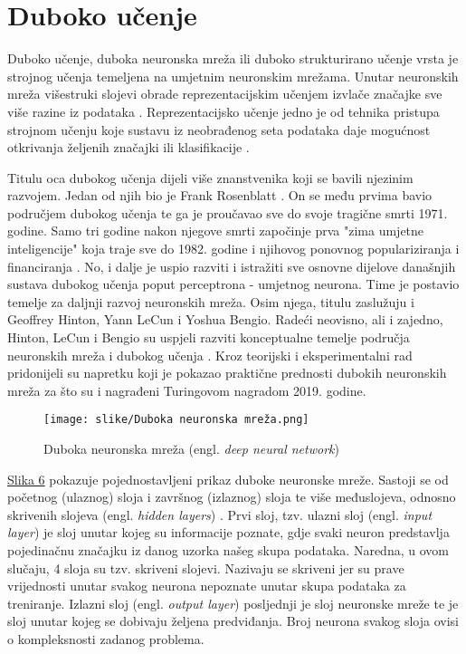\documentclass[]{foi} %
\begin{document}
\section{Duboko učenje}
Duboko učenje, duboka neuronska mreža ili duboko strukturirano učenje vrsta je strojnog učenja temeljena na umjetnim neuronskim mrežama. Unutar neuronskih mreža višestruki slojevi obrade reprezentacijskim učenjem izvlače značajke sve više razine iz podataka \cite{dubokoRepr}. Reprezentacijsko učenje jedno je od tehnika pristupa strojnom učenju koje sustavu iz neobrađenog seta podataka daje mogućnost otkrivanja željenih značajki ili klasifikacije \cite{reprezentacijskoUcenje}.

Titulu oca dubokog učenja dijeli više znanstvenika koji se bavili njezinim razvojem. Jedan od njih bio je Frank Rosenblatt \cite{acmTuring}. On se među prvima bavio područjem dubokog učenja te ga je proučavao sve do svoje tragične smrti 1971. godine. Samo tri godine nakon njegove smrti započinje prva "zima umjetne inteligencije" koja traje sve do 1982. godine i njihovog ponovnog populariziranja i financiranja \cite{povijestAI}. No, i dalje je uspio razviti i istražiti sve osnovne dijelove današnjih sustava dubokog učenja poput perceptrona - umjetnog neurona. Time je postavio temelje za daljnji razvoj neuronskih mreža. Osim njega, titulu zaslužuju i Geoffrey Hinton, Yann LeCun i Yoshua Bengio. Radeći neovisno, ali i zajedno, Hinton, LeCun i Bengio su uspjeli razviti konceptualne temelje područja neuronskih mreža i dubokog učenja \cite{lecun_deep_2015}. Kroz teorijski i eksperimentalni rad pridonijeli su napretku koji je pokazao praktične prednosti dubokih neuronskih mreža za što su i nagrađeni Turingovom nagradom 2019. godine.

\begin{figure}[H]
    \centering
    \texttt{[image: slike/Duboka neuronska mreža.png]}
    \caption{Duboka neuronska mreža (engl. \textit{deep neural network})}
\end{figure}
\label{img: slika 6}

\hyperref[img: slika 6]{Slika 6} pokazuje pojednostavljeni prikaz duboke neuronske mreže. Sastoji se od početnog (ulaznog) sloja i završnog (izlaznog) sloja te više međuslojeva, odnosno skrivenih slojeva (engl. \textit{hidden layers}) \cite{dubokoRepr}. Prvi sloj, tzv. ulazni sloj (engl. \textit{input layer}) je sloj unutar kojeg su informacije poznate, gdje svaki neuron predstavlja pojedinačnu značajku iz danog uzorka našeg skupa podataka. Naredna, u ovom slučaju, 4 sloja su tzv. skriveni slojevi. Nazivaju se skriveni jer su prave vrijednosti unutar svakog neurona nepoznate unutar skupa podataka za treniranje. Izlazni sloj (engl. \textit{output layer}) posljednji je sloj neuronske mreže te je sloj unutar kojeg se dobivaju željena predviđanja. Broj neurona svakog sloja ovisi o kompleksnosti zadanog problema.
\end{document}
